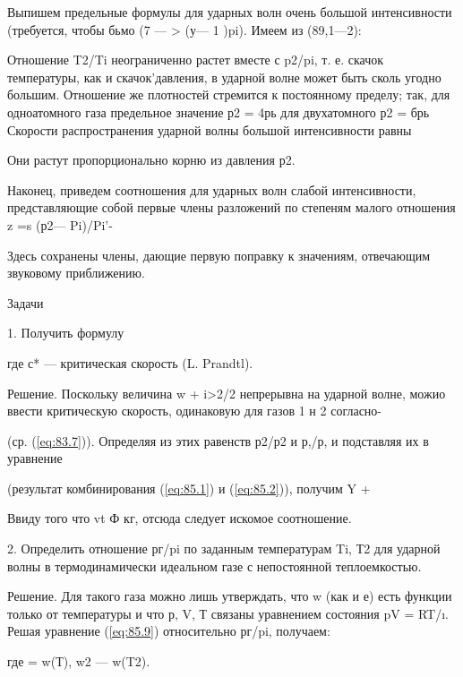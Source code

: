 Выпишем предельные формулы для ударных волн очень большой интенсивности
(требуется, чтобы бьмо (7 — > (у— 1 )pi). Имеем из (89,1—2):


Отношение T2/Ti неограниченно растет вместе с p2/pi, т. е. скачок температуры,
как и скачок'давления, в ударной волне может быть сколь угодно большим.
Отношение же плотностей стремится к постоянному пределу; так, для одноатомного
газа предельное значение р2 = 4рь для двухатомного р2 = брь Скорости
распространения ударной волны большой интенсивности равны


Они растут пропорционально корню из давления р2.

Наконец, приведем соотношения для ударных волн слабой интенсивности,
представляющие собой первые члены разложений по степеням малого отношения z =s
(р2— Pi)/Pi'-

Здесь сохранены члены, дающие первую поправку к значениям, отвечающим звуковому
приближению.

Задачи

1. Получить формулу


где с* — критическая скорость (L. Prandtl).

Решение. Поскольку величина w + i>2/2 непрерывна на ударной волне, можио ввести
критическую скорость, одинаковую для газов 1 н 2 согласно-



(ср. (\ref{eq:83.7})). Определяя из этих равенств р2/р2 и р,/р, и подставляя их в~
уравнение


(результат комбинирования (\ref{eq:85.1}) и (\ref{eq:85.2})), получим Y +

 Ввиду того что vt Ф кг, отсюда следует искомое соотношение.


2. Определить отношение рг/pi по заданным температурам Ti, Т2 для ударной волны
в термодинамически идеальном газе с непостоянной теплоемкостью.

Решение. Для такого газа можно лишь утверждать, что w (как и е) есть функции
только от температуры и что р, V, Т связаны уравнением состояния pV = RT/\i.
Решая уравнение (\ref{eq:85.9}) относительно рг/pi, получаем:



где = w(Т), w2 — w(T2).
\begin{comment}
\end{comment}

